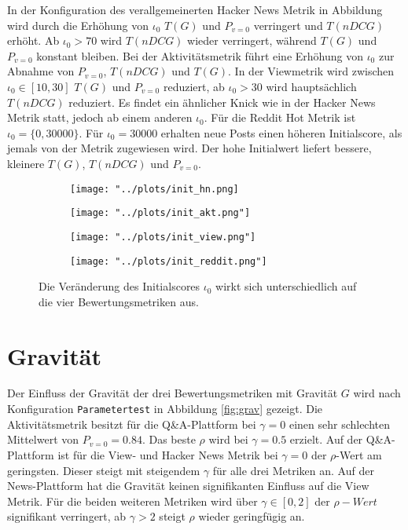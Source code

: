 In der Konfiguration des  verallgemeinerten Hacker News Metrik in Abbildung wird durch die Erhöhung von $\iota_0$ $T(G)$ und $P_{v=0}$ verringert und $T(nDCG)$ erhöht. Ab $\iota_0 > 70$ wird $T(nDCG)$ wieder verringert, während $T(G)$ und $P_{v=0}$ konstant bleiben. Bei der Aktivitätsmetrik führt eine Erhöhung von $\iota_0$ zur Abnahme von $P_{v=0}$, $T(nDCG)$ und $T(G)$. In der Viewmetrik wird zwischen $\iota_0 \in [10,30]$ $T(G)$ und $P_{v=0}$ reduziert, ab $\iota_0 > 30$ wird hauptsächlich $T(nDCG)$ reduziert. Es findet ein ähnlicher Knick wie in der Hacker News Metrik statt, jedoch ab einem anderen $\iota_0$. Für die Reddit Hot Metrik ist $\iota_0 = \{0,30000\}$. Für $\iota_0 = 30000$ erhalten neue Posts einen höheren Initialscore, als jemals von der Metrik zugewiesen wird. Der hohe Initialwert liefert bessere, kleinere $T(G)$, $T(nDCG)$ und $P_{v=0}$. 

\begin{figure}[!htb]
	\begin{subfigure}{0.5\textwidth}
		\texttt{[image: "../plots/init\_hn.png]}%
		\label{init_hn}
	\end{subfigure}
	\hfill
	\begin{subfigure}{0.5\textwidth}
		\texttt{[image: "../plots/init\_akt.png"]}%
		\label{init_akt}
	\end{subfigure}
	\begin{subfigure}{0.5\textwidth}
		\texttt{[image: "../plots/init\_view.png"]}%
		\label{init_view}
	\end{subfigure}
	\hfill
	\begin{subfigure}{0.5\textwidth}
		\texttt{[image: "../plots/init\_reddit.png"]}%
		\label{init_reddit}
	\end{subfigure}
	\caption{Die Veränderung des Initialscores $\iota_0$ wirkt sich unterschiedlich auf die vier Bewertungsmetriken aus.}
	\label{fig:init_scoring_functions}
\end{figure}


\section{Gravität}

Der Einfluss der Gravität der drei Bewertungsmetriken mit Gravität $G$ wird nach Konfiguration \texttt{Parametertest} in Abbildung \ref{fig:grav} gezeigt. Die Aktivitätsmetrik besitzt für die Q\&A-Plattform bei $\gamma = 0$ einen sehr schlechten Mittelwert von $P_{v=0} = 0.84$. Das beste $\rho$ wird bei $\gamma = 0.5$ erzielt. Auf der Q\&A-Plattform ist für die View- und Hacker News Metrik bei $\gamma = 0$ der $\rho$-Wert am geringsten. Dieser steigt mit steigendem $\gamma$ für alle drei Metriken an. Auf der News-Plattform hat die Gravität keinen signifikanten Einfluss auf die View Metrik. Für die beiden weiteren Metriken wird über $\gamma \in [0,2]$ der $\rho-Wert$ signifikant verringert, ab $\gamma > 2$ steigt $\rho$ wieder geringfügig an. 

